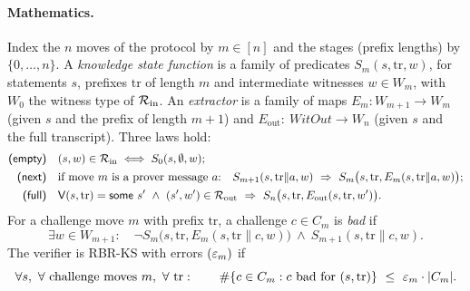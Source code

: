 \paragraph{Mathematics.} Index the $n$ moves of the protocol by $m\in[n]$ and the stages (prefix
lengths) by $\{0,\dots,n\}$. A \emph{knowledge state function} is a family of predicates
$S_m(s,\mathrm{tr},w)$, for statements $s$, prefixes $\mathrm{tr}$ of length $m$ and intermediate
witnesses $w\in W_m$, with $W_0$ the witness type of $\mathcal{R}_{\mathrm{in}}$. An \emph{extractor} is a
family of maps $E_m: W_{m+1}\to W_m$ (given $s$ and the prefix of length $m+1$) and
$E_{\mathrm{out}}:\ \mathit{WitOut}\to W_n$ (given $s$ and the full transcript). Three laws hold:
\begin{align*}
\textsf{(empty)}\quad & (s,w)\in\R_{\mathrm{in}} \iff S_0(s,\emptyset,w);\\
\textsf{(next)}\quad & \text{if move $m$ is a prover message $a$:}\quad
  S_{m+1}(s,\mathrm{tr}\|a,w)\ \Rightarrow\ S_m\bigl(s,\mathrm{tr},E_m(s,\mathrm{tr}\|a,w)\bigr);\\
\textsf{(full)}\quad & \Vrf(s,\mathrm{tr})=\mathsf{some}\ s' \ \wedge\ (s',w')\in\R_{\mathrm{out}}
  \ \Rightarrow\ S_n\bigl(s,\mathrm{tr},E_{\mathrm{out}}(s,\mathrm{tr},w')\bigr).
\end{align*}
For a challenge move $m$ with prefix $\mathrm{tr}$, a challenge $c\in C_m$ is \emph{bad} if
\[ \exists w\in W_{m+1}:\quad \neg S_m\bigl(s,\mathrm{tr},E_m(s,\mathrm{tr}\|c,w)\bigr)\ \wedge\
   S_{m+1}(s,\mathrm{tr}\|c,w). \]
The verifier is RBR-KS with errors $(\varepsilon_m)$ if
\[ \forall s,\ \forall\ \text{challenge moves } m,\ \forall\ \mathrm{tr}:\qquad
   \#\{c\in C_m : c \text{ bad for } (s,\mathrm{tr})\}\ \le\ \eps_m\cdot|C_m| . \]

